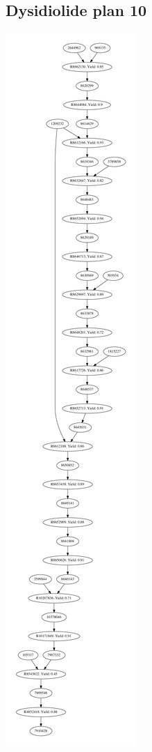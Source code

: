\documentclass[a4paper,10pt,titlepage]{paper}
\begin{document}
\subsection{Dysidiolide plan 10}
\centering
\includegraphics[scale=0.2]{Synteseplaner/Dysidiolide/plan10.pdf}
\label{Appendix::Dysidiolide10}
\end{document}
